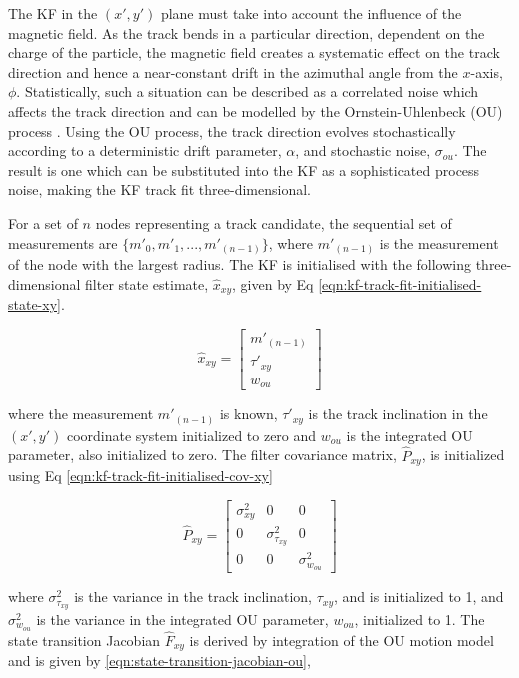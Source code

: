 The KF in the $(x', y')$ plane must take into account the influence of the magnetic field. As the track bends in a particular direction, dependent on the charge of the particle, the magnetic field creates a systematic effect on the track direction and hence a near-constant drift in the azimuthal angle from the $x$-axis, $\phi$. Statistically, such a situation can be described as a correlated noise which affects the track direction and can be modelled by the Ornstein-Uhlenbeck (OU) process \cite{OU}. Using the OU process, the track direction evolves stochastically according to a deterministic drift parameter, $\alpha$, and stochastic noise, $\sigma_{ou}$. The result is one which can be substituted into the KF as a sophisticated process noise, making the KF track fit three-dimensional.

For a set of $n$ nodes representing a track candidate, the sequential set of measurements are $\{m'_0, m'_1, ..., m'_{(n-1)} \}$, where $m'_{(n-1)}$ is the measurement of the node with the largest radius. The KF is initialised with the following three-dimensional filter state estimate, $\hat{x}_{xy}$, given by Eq \eqref{eqn:kf-track-fit-initialised-state-xy}.


\begin{equation}
\hat{x}_{xy} = \begin{bmatrix} m'_{(n-1)} \\ \tau'_{xy} \\ w_{ou} \end{bmatrix} 
\label{eqn:kf-track-fit-initialised-state-xy}
\end{equation}

where the measurement $m'_{(n-1)}$ is known, $\tau'_{xy}$ is the track inclination in the $(x', y')$ coordinate system initialized to zero and $w_{ou}$ is the integrated OU parameter, also initialized to zero. The filter covariance matrix, $\hat{P}_{xy}$, is initialized using Eq \eqref{eqn:kf-track-fit-initialised-cov-xy}

\begin{equation}
\hat{P}_{xy} = \begin{bmatrix} \sigma_{xy}^2 & 0 & 0 
                            \\ 0 & \sigma_{\tau_{xy}}^2 & 0 
                            \\ 0 & 0 & \sigma_{w_{ou}}^2 \end{bmatrix} 
\label{eqn:kf-track-fit-initialised-cov-xy}
\end{equation}

where $\sigma_{\tau_{xy}}^2$ is the variance in the track inclination, $\tau_{xy}$, and is initialized to 1, and $\sigma_{w_{ou}}^2$ is the variance in the integrated OU parameter, $w_{ou}$, initialized to 1. The state transition Jacobian $\hat{F}_{xy}$ is derived by integration of the OU motion model \cite{OU} and is given by \eqref{eqn:state-transition-jacobian-ou},

